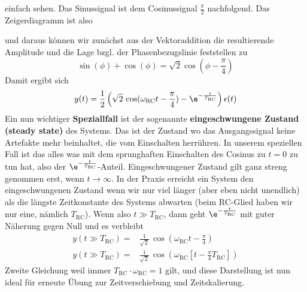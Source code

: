 \begin{Loesung}
\begin{itemize}
einfach sehen. Das Sinussignal ist dem Cosinussignal $\frac{\pi}{2}$ nachfolgend.
Das Zeigerdiagramm ist also
\begin{center}
\end{center}
und daraus können wir zunächst aus der Vektoraddition die resultierende Amplitude und
die Lage bzgl. der Phasenbezugslinie feststellen zu
\begin{equation}
  \sin(\phi) + \cos(\phi) = \sqrt{2} \cos(\phi-\frac{\pi}{4})
\end{equation}
Damit ergibt sich
\begin{align}
  y(t) = \frac{1}{2}\left(
  \sqrt{2}\,\cos(\omega_\mathrm{RC} t - \frac{\pi}{4}) - \e^{-\frac{t}{T_\mathrm{RC}}}
  \right) \epsilon(t)
\end{align}
Ein nun wichtiger \textbf{Speziallfall} ist der sogenannte \textbf{eingeschwungene
Zustand (steady state)} des Systems.
%
Das ist der Zustand wo das Ausgangssignal keine Artefakte mehr beinhaltet, die
vom Einschalten herrühren.
In unserem speziellen Fall ist das alles was mit dem sprunghaften Einschalten
des Cosinus zu $t=0$ zu tun hat, also der
$\e^{-\frac{t}{T_\mathrm{RC}}}$-Anteil.
%
Eingeschwungener Zustand gilt ganz streng genommen erst, wenn $t\to\infty$.
In der Praxis erreicht ein System den eingeschwungenen Zustand wenn wir nur viel
länger (aber eben nicht unendlich) als die längste Zeitkonstante des Systems
abwarten (beim RC-Glied haben wir nur eine, nämlich $T_\mathrm{RC}$).
%
Wenn also $t \gg T_\mathrm{RC}$,
dann geht $\e^{-\frac{t}{T_\mathrm{RC}}}$ mit guter Näherung gegen Null
und es verbleibt
\begin{align}
  y(t \gg T_\mathrm{RC}) =& \frac{1}{\sqrt{2}} \,\cos(\omega_\mathrm{RC} t - \frac{\pi}{4})\\
  y(t \gg T_\mathrm{RC}) =& \frac{1}{\sqrt{2}} \,\cos(\omega_\mathrm{RC} \left[t - \frac{\pi}{4} T_\mathrm{RC}\right])
\end{align}
Zweite Gleichung weil immer $T_\mathrm{RC}\cdot \omega_\mathrm{RC} =1$ gilt, und diese Darstellung ist nun ideal für erneute Übung
zur Zeitverschiebung und Zeitskalierung.


\end{itemize}
\end{Loesung}
